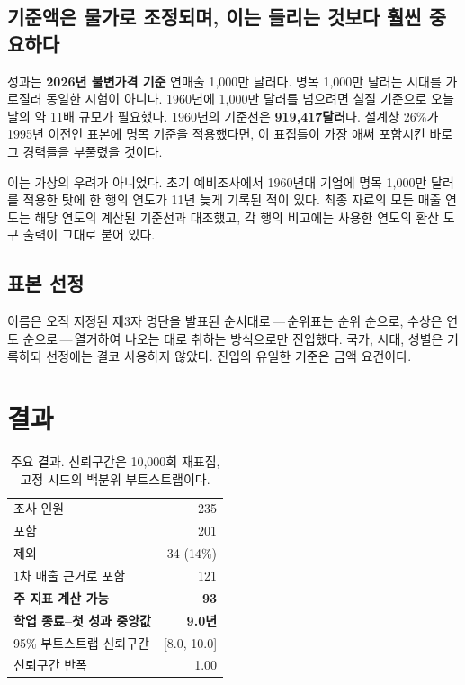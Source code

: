 \documentclass[11pt]{article}
\begin{document}
\subsection{기준액은 물가로 조정되며, 이는 들리는 것보다 훨씬 중요하다}

성과는 \textbf{2026년 불변가격 기준} 연매출 1{,}000만 달러다. 명목 1{,}000만 달러는
시대를 가로질러 동일한 시험이 아니다. 1960년에 1{,}000만 달러를 넘으려면 실질 기준으로
오늘날의 약 11배 규모가 필요했다. 1960년의 기준선은 \textbf{919{,}417달러}다. 설계상
26\%가 1995년 이전인 표본에 명목 기준을 적용했다면, 이 표집틀이 가장 애써 포함시킨
바로 그 경력들을 부풀렸을 것이다.

이는 가상의 우려가 아니었다. 초기 예비조사에서 1960년대 기업에 명목 1{,}000만 달러를
적용한 탓에 한 행의 연도가 11년 늦게 기록된 적이 있다. 최종 자료의 모든 매출 연도는
해당 연도의 계산된 기준선과 대조했고, 각 행의 비고에는 사용한 연도의 환산 도구 출력이
그대로 붙어 있다.

\subsection{표본 선정}

이름은 오직 지정된 제3자 명단을 발표된 순서대로\,---\,순위표는 순위 순으로, 수상은
연도 순으로\,---\,열거하여 나오는 대로 취하는 방식으로만 진입했다. 국가, 시대, 성별은
기록하되 선정에는 결코 사용하지 않았다. 진입의 유일한 기준은 금액 요건이다.

\section{결과}

\begin{table}[h]
\centering
\begin{tabular}{lr}
\toprule
조사 인원 & 235 \\
포함 & 201 \\
제외 & 34 (14\%) \\
1차 매출 근거로 포함 & 121 \\
\textbf{주 지표 계산 가능} & \textbf{93} \\
\midrule
\textbf{학업 종료--첫 성과 중앙값} & \textbf{9.0년} \\
95\% 부트스트랩 신뢰구간 & [8.0, 10.0] \\
신뢰구간 반폭 & 1.00 \\
\bottomrule
\end{tabular}
\caption{주요 결과. 신뢰구간은 10{,}000회 재표집, 고정 시드의 백분위 부트스트랩이다.}
\end{table}
\end{document}
